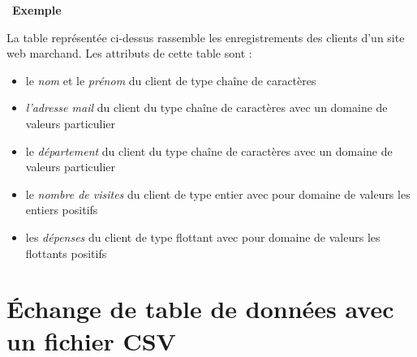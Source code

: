 \documentclass[
  11pt,
]{article}
\providecommand{\tightlist}{%
  \setlength{\itemsep}{0pt}\setlength{\parskip}{0pt}}
\newcounter{exple}
\newenvironment{exemple}[1]
{\par \medskip   \addtocounter{exple}{1} \noindent  
\begin{bclogo}[arrondi =0.1,   noborder = true, logo=\bclampe, marge=4]{~\textbf{Exemple} \textbf{\theexple} {\itshape #1} }  \par}
{
\end{bclogo}
 \par \bigskip }
\begin{document}
\begin{exemple}{}

La table représentée ci-dessus rassemble les enregistrements des clients
d'un site web marchand. Les attributs de cette table sont :

\begin{itemize}
\tightlist
\item
  le \emph{nom} et le \emph{prénom} du client de type chaîne de
  caractères
\item
  \emph{l'adresse mail} du client du type chaîne de caractères avec un
  domaine de valeurs particulier
\item
  le \emph{département} du client du type chaîne de caractères avec un
  domaine de valeurs particulier
\item
  le \emph{nombre de visites} du client de type entier avec pour domaine
  de valeurs les entiers positifs
\item
  les \emph{dépenses} du client de type flottant avec pour domaine de
  valeurs les flottants positifs
\end{itemize}

\end{exemple}

\hypertarget{uxe9change-de-table-de-donnuxe9es-avec-un-fichier-csv}{%
\section{Échange de table de données avec un fichier
CSV}\label{uxe9change-de-table-de-donnuxe9es-avec-un-fichier-csv}}
\end{document}
